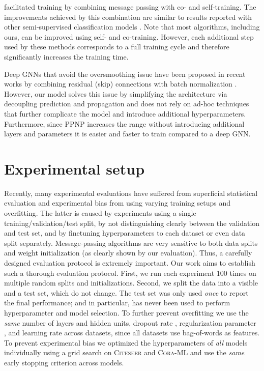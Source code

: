 \documentclass{article} \usepackage{iclr2019_conference,times}
\begin{document}
\citet{li_deeper_2018} facilitated training by combining message passing with co- and self-training. The improvements achieved by this combination are similar to results reported with other semi-supervised classification models \citep{buchnik_bootstrapped_2018}. Note that most algorithms, including ours, can be improved using self- and co-training. However, each additional step used by these methods corresponds to a full training cycle and therefore significantly increases the training time.

Deep GNNs that avoid the oversmoothing issue have been proposed in recent works by combining residual (skip) connections with batch normalization \citep{kawamoto_mean-field_2018,chen_supervised_2019}. However, our model solves this issue by simplifying the architecture via decoupling prediction and propagation and does not rely on ad-hoc techniques that further complicate the model and introduce additional hyperparameters. Furthermore, since PPNP increases the range without introducing additional layers and parameters it is easier and faster to train compared to a deep GNN.

\section{Experimental setup} \label{sec:expsetup}

Recently, many experimental evaluations have suffered from superficial statistical evaluation and experimental bias from using varying training setups and overfitting. The latter is caused by experiments using a single training/validation/test split, by not distinguishing clearly between the validation and test set, and by finetuning hyperparameters to each dataset or even data split separately.
Message-passing algorithms are very sensitive to both data splits and weight initialization (as clearly shown by our evaluation). Thus, a carefully designed evaluation protocol is extremely important. Our work aims to establish such a thorough evaluation protocol. First, we run each experiment 100 times on multiple random splits and initializations. Second, we split the data into a visible and a test set, which do not change. The test set was only used \emph{once} to report the final performance; and in particular, has never been used to perform hyperparameter and model selection. To further prevent overfitting we use the \emph{same} number of layers and hidden units, dropout rate ,  regularization parameter , and learning rate  across datasets, since all datasets use bag-of-words as features.
To prevent experimental bias we optimized the hyperparameters of \emph{all} models individually using a grid search on \textsc{Citeseer} and \textsc{Cora-ML} and use the \emph{same} early stopping criterion across models.
\end{document}
